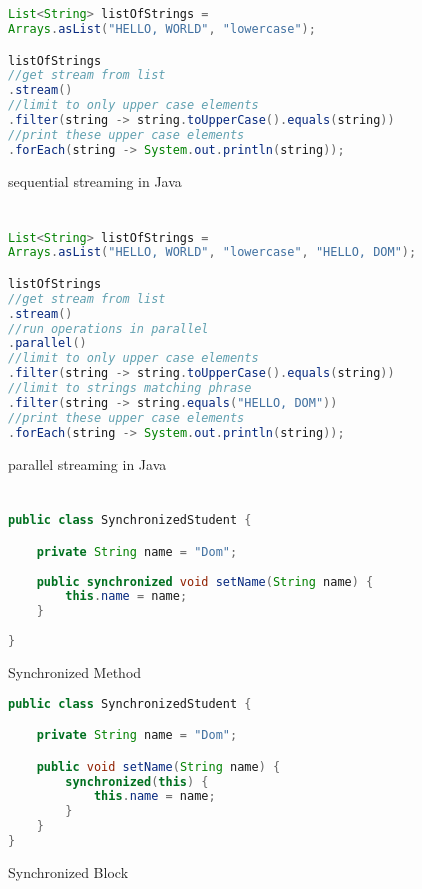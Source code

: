 \documentclass[]{report}
\begin{document}
\chapter{}
\begin{figure}[h!]
\caption{sequential streaming in Java}
\begin{lstlisting}[language=Java,frame=single]
List<String> listOfStrings = 
Arrays.asList("HELLO, WORLD", "lowercase");

listOfStrings
//get stream from list
.stream()
//limit to only upper case elements
.filter(string -> string.toUpperCase().equals(string))
//print these upper case elements
.forEach(string -> System.out.println(string));
\end{lstlisting}
\end{figure}

\chapter{}
\begin{figure}[h!]
\caption{parallel streaming in Java}
\begin{lstlisting}[language=Java,frame=single]
List<String> listOfStrings = 
Arrays.asList("HELLO, WORLD", "lowercase", "HELLO, DOM");

listOfStrings
//get stream from list
.stream()
//run operations in parallel
.parallel()
//limit to only upper case elements
.filter(string -> string.toUpperCase().equals(string))
//limit to strings matching phrase
.filter(string -> string.equals("HELLO, DOM"))
//print these upper case elements
.forEach(string -> System.out.println(string));
\end{lstlisting}
\end{figure}

\chapter{}
\begin{figure}[h!]
\caption{Synchronized Method}
\begin{lstlisting}[language=Java,frame=single]
public class SynchronizedStudent {

	private String name = "Dom";
	
	public synchronized void setName(String name) {
		this.name = name;
	}
	
}
\end{lstlisting}
\end{figure}

\begin{figure}[h!]
\caption{Synchronized Block}
\begin{lstlisting}[language=Java,frame=single]
public class SynchronizedStudent {

	private String name = "Dom";

	public void setName(String name) {
		synchronized(this) {
			this.name = name;
		}
	}
}
\end{lstlisting}
\end{figure}
\end{document}
